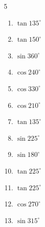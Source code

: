 \begin{multicols}{5}
\begin{enumerate}
  \item $\displaystyle \tan{135^\circ}$

        \phantom{$\displaystyle =-1$}

  \item $\displaystyle \tan{150^\circ}$


  \item $\displaystyle \sin{360^\circ}$

        \phantom{$\displaystyle =0$}

  \item $\displaystyle \cos{240^\circ}$


  \item $\displaystyle \cos{330^\circ}$


  \item $\displaystyle \cos{210^\circ}$


  \item $\displaystyle \tan{135^\circ}$

        \phantom{$\displaystyle =-1$}

  \item $\displaystyle \sin{225^\circ}$


  \item $\displaystyle \sin{180^\circ}$

        \phantom{$\displaystyle =0$}

  \item $\displaystyle \tan{225^\circ}$

        \phantom{$\displaystyle =1$}

\columnbreak %

  \item $\displaystyle \tan{225^\circ}$

        \phantom{$\displaystyle =1$}

  \item $\displaystyle \cos{270^\circ}$

        \phantom{$\displaystyle =0$}

  \item $\displaystyle \sin{315^\circ}$


\end{enumerate}
\end{multicols}
